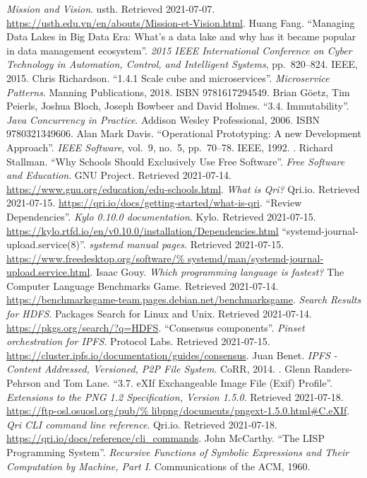 \begin{thebibliography}{69}
   \emph{Mission and Vision}.
    \acrlong{usth}.  Retrieved 2021-07-07.
    \url{https://usth.edu.vn/en/abouts/Mission-et-Vision.html}.
   Huang Fang.
    ``Managing Data Lakes in Big Data Era: What's a data lake
    and why has it became popular in data management ecosystem''.
    \emph{2015 IEEE International Conference on Cyber Technology
    in Automation, Control, and Intelligent Systems}, pp.~820--824.
    IEEE, 2015.  
   Chris Richardson.
    ``1.4.1 Scale cube and microservices''.  \emph{Microservice Patterns}.
    Manning Publications, 2018.  ISBN 9781617294549.
   Brian Göetz, Tim Peierls, Joshua Bloch,
    Joseph Bowbeer and David Holmes.
    ``3.4. Immutability''.  \emph{Java Concurrency in Practice}.
    Addison Wesley Professional, 2006.  ISBN 9780321349606.
   Alan Mark Davis.
    ``Operational Prototyping: A new Development Approach''.
    \emph{IEEE Software}, vol.~9, no.~5, pp.~70--78.
    IEEE, 1992.  .
   Richard Stallman.
    ``Why Schools Should Exclusively Use Free Software''.
    \emph{Free Software and Education}.  GNU Project.  Retrieved 2021-07-14.
    \url{https://www.gnu.org/education/edu-schools.html}.
   \emph{What is Qri?} Qri.io.  Retrieved 2021-07-15.
    \url{https://qri.io/docs/getting-started/what-is-qri}.
   ``Review Dependencies''.  \emph{Kylo 0.10.0 documentation}.
    Kylo.  Retrieved 2021-07-15.
    \url{https://kylo.rtfd.io/en/v0.10.0/installation/Dependencies.html}
   ``systemd-journal-upload.service(8)''.
    \emph{systemd manual pages}.  Retrieved 2021-07-15.
    \url{https://www.freedesktop.org/software/%
         systemd/man/systemd-journal-upload.service.html}.
   Isaac Gouy.
    \emph{Which programming language is fastest?}
    The Computer Language Benchmarks Game.
    Retrieved 2021-07-14.
    \url{https://benchmarksgame-team.pages.debian.net/benchmarksgame}.
   \emph{Search Results for HDFS}.
    Packages Search for Linux and Unix.
    Retrieved 2021-07-14.  \url{https://pkgs.org/search/?q=HDFS}.
   ``Consensus components''.
    \emph{Pinset orchestration for IPFS}.
    Protocol Labs.  Retrieved 2021-07-15.
    \url{https://cluster.ipfs.io/documentation/guides/consensus}.
   Juan Benet.
    \emph{IPFS - Content Addressed, Versioned, P2P File System}.
    CoRR, 2014.  .
   Glenn Randers-Pehrson and Tom Lane.
    ``3.7. eXIf Exchangeable Image File (Exif) Profile''.
    \emph{Extensions to the PNG 1.2 Specification, Version 1.5.0}.
    Retrieved 2021-07-18.  \url{https://ftp-osl.osuosl.org/pub/%
    libpng/documents/pngext-1.5.0.html#C.eXIf}.
   \emph{Qri CLI command line reference}.  Qri.io.
    Retrieved 2021-07-18.  \url{https://qri.io/docs/reference/cli_commands}.
   John McCarthy.
    ``The LISP Programming System''.
    \emph{Recursive Functions of Symbolic Expressions
    and Their Computation by Machine, Part I}.
    Communications of the ACM, 1960.
\end{thebibliography}
